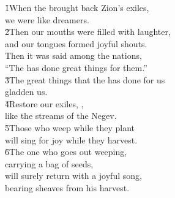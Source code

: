 \begin{poetry}
\poeml \v{1}When the  brought back Zion's exiles, \\
\poemll    we were like dreamers. \\
\poeml \v{2}Then our mouths were filled with laughter, \\
\poemll    and our tongues formed joyful shouts. \\
\poeml Then it was said among the nations, \\
\poemll    ``The  has done great things for them.'' \\
\poeml \v{3}The great things that the  has done for us \\
\poemll    gladden us. \\
\poeml \v{4}Restore our exiles, , \\
\poemll    like the streams of the Negev. \\
\poeml \v{5}Those who weep while they plant \\
\poemll    will sing for joy while they harvest. \\
\poeml \v{6}The one who goes out weeping, \\
\poemll    carrying a bag of seeds, \\
\poeml will surely return with a joyful song, \\
\poemll    bearing sheaves from his harvest.
\end{poetry}

